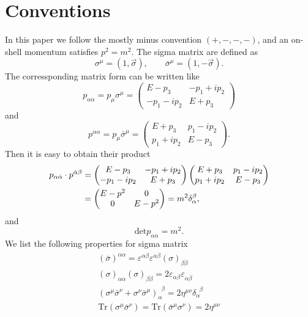 \documentclass[12pt]{article}
\numberwithin{equation}{section}
\begin{document}
\section{Conventions}

In this paper we follow the mostly minus convention $(+, -, -, -)$, and an on-shell momentum satisfies $p^2 = m^2$. The sigma matrix are defined as
\begin{equation}
    \sigma^\mu=(1,\vec{\sigma}),\qquad \bar{\sigma}^\mu=(1,-\vec{\sigma}).
\end{equation}
The corressponding matrix form can be written like 
\begin{equation}
    p_{\alpha\dot{\alpha}}=p_\mu \sigma^\mu=\begin{pmatrix}
        E-p_3 & -p_1+ip_2 \\
        -p_1-ip_2 & E+p_3
    \end{pmatrix}
\end{equation}
and 
\begin{equation}
    p^{\dot{\alpha}\alpha}=p_\mu \bar{\sigma}^\mu=\begin{pmatrix}
        E+p_3 & p_1-ip_2 \\
        p_1+ip_2 & E-p_3
    \end{pmatrix}.
\end{equation}
Then it is easy to obtain their product 
\begin{align}
    p_{\alpha\dot{\alpha}}\cdot p^{\dot{\alpha}\beta}&=\begin{pmatrix}
        E-p_3 & -p_1+ip_2 \\
        -p_1-ip_2 & E+p_3
    \end{pmatrix}
    \begin{pmatrix}
        E+p_3 & p_1-ip_2 \\
        p_1+ip_2 & E-p_3
    \end{pmatrix}\notag\\
    &=\begin{pmatrix}
        E-p^2 & 0 \\
        0 & E-p^2 
    \end{pmatrix}=m^2\delta_\alpha^\beta,
    \label{A.4}
\end{align}
and 
\begin{equation}
    \mathrm{det}p_{\alpha\dot{\alpha}}=m^2.
\end{equation}
We list the following properties for sigma matrix
\begin{gather}
    (\bar{\sigma})^{\dot{\alpha}\alpha}=\varepsilon^{\alpha\beta}\varepsilon^{\dot{\alpha}\dot{\beta}}(\sigma)_{\beta\dot{\beta}}\\
    (\sigma)_{\alpha\dot{\alpha}}(\sigma)_{\beta\dot{\beta}}=2\varepsilon_{\alpha\beta}\varepsilon_{\dot{\alpha}\dot{\beta}}\\
    (\sigma^\mu\bar{\sigma}^\nu+\sigma^\nu\bar{\sigma}^\mu)_\alpha^{\phantom{a}\beta}=2\eta^{\mu\nu}\delta_\alpha^{\phantom{a}\beta}\\
    \mathrm{Tr}(\sigma^\mu\bar{\sigma}^\nu)=\mathrm{Tr}(\bar{\sigma}^\mu\sigma^\nu)=2\eta^{\mu\nu} \label{A.9} 
\end{gather}
\end{document}
